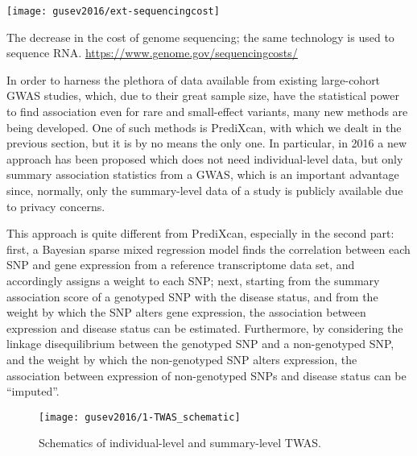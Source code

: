 \documentclass[../main.tex]{subfiles}
\begin{document}
\begin{marginfigure}[-13cm]
	\texttt{[image: gusev2016/ext-sequencingcost]}
	\caption[Sequencing cost over time]{The decrease in the cost of 
	genome sequencing; the same technology is used to sequence RNA. 
	\url{https://www.genome.gov/sequencingcosts/}}
\end{marginfigure}

In order to harness the plethora of data available from existing 
large-cohort GWAS studies, which, due to their great sample size, have 
the statistical power to find association even for rare and small-effect 
variants, many new methods are being developed. One of such methods is 
PrediXcan, with which we dealt in the previous section, but it is by no 
means the only one. In particular, in 2016 a new approach has been 
proposed which does not need individual-level data, but only summary 
association statistics from a GWAS, which is an important advantage since, 
normally, only the summary-level data of a study is publicly available 
due to privacy concerns.

This approach is quite different from PrediXcan, especially in the 
second part: first, a Bayesian sparse mixed regression model finds the 
correlation between each SNP and gene expression from a reference 
transcriptome data set, and accordingly assigns a weight to each SNP; 
next, starting from the summary association score of a genotyped SNP 
with the disease status, and from the weight by which the SNP alters 
gene expression, the association between expression and disease status 
can be estimated. Furthermore, by considering the linkage disequilibrium 
between the genotyped SNP and a non-genotyped SNP, and the weight by 
which the non-genotyped SNP alters expression, the association between 
expression of non-genotyped SNPs and disease status can be 
\enquote{imputed}.

\begin{figure}
	\texttt{[image: gusev2016/1-TWAS\_schematic]}
	\caption{Schematics of individual-level and summary-level TWAS.}
\end{figure}
\end{document}
